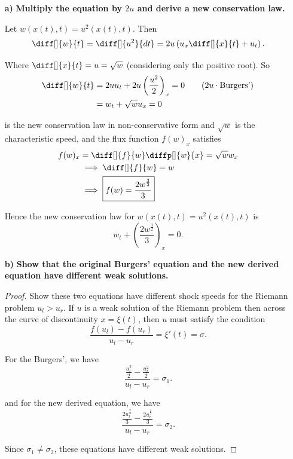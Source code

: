 \begin{itemize}
  \item[ \textbf{a)} ] \textbf{Multiply the equation by $2u$ and derive a new conservation law.} 
    \par Let $w(x(t),t) = u^{2}(x(t),t)$. Then
    \[
      \diff[]{w}{t} = \diff[]{u^{2}}{dt} = 2u \left( u_{x}\diff[]{x}{t} + u_{t} \right)
    .\] 

    Where $\diff[]{x}{t} = u = \sqrt{w}$ (considering only the positive root).
    So
    \begin{align*}
      \diff[]{w}{t} &= 2uu_{t} + 2u \left( \frac{u^{2}}{2} \right)_{x}
      = 0 \quad\quad (2u\cdot\text{Burgers'})\\
                    &= w_{t} + \sqrt{w}u_{x} = 0
    \end{align*}

    is the new conservation law in non-conservative form and $\sqrt{w}$ is the
    characteristic speed, and the flux function $f(w)_{x}$ satisfies
    \begin{align*}
      f(w)_{x} &= \diff[]{f}{w} \diffp[]{w}{x} =\sqrt{w}w_{x} \\
               &\implies \diff[]{f}{w} = w \\
               &\implies \boxed{f(w) = \frac{2w^{\frac{3}{2}}}{3}}
    \end{align*}

    Hence the new conservation law for $w(x(t),t) = u^{2}(x(t),t)$ is
    \[
      \boxed{w_{t}+ \left( \frac{2w^{\frac{3}{2}}}{3} \right)_{x} = 0}
    .\] 

  \item[ \textbf{b)}] \textbf{Show that the original Burgers' equation and the
    new derived equation have different weak solutions.} 
    
    \begin{proof}
      
      \par Show these two equations have different shock speeds for the Riemann
      problem $u_{l}> u_{r}$. If $u$ is a weak solution of the Riemann problem
      then across the curve of discontinuity $x=\xi(t)$, then $u$ must satisfy
      the condition
      \[
        \frac{f(u_{l}) - f(u_{r})}{u_{l}-u_{r}} = \xi'(t) = \sigma
      .\] 

      For the Burgers', we have
      \[
        \frac{ \frac{u_{l}^{2}}{2} - \frac{u_{r}^{2}}{2}}{u_{l}-u_{r}} = \sigma_1
      .\] 

      and for the new derived equation, we have
      \[
        \frac{ \frac{2u_{l}^{\frac{2}{3}}}{3}
        - \frac{2u_{r}^{\frac{2}{3}}}{3}}{u_{l}-u_{r}} = \sigma_2
      .\] 

      Since $\sigma_1 \neq \sigma_{2}$, these equations have different weak
      solutions.

    \end{proof}

\end{itemize}

